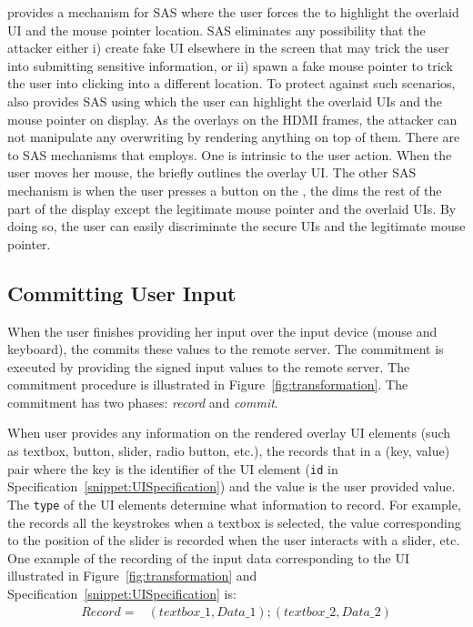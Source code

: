 \name provides a mechanism for SAS where the user forces the \device to highlight the overlaid UI and the mouse pointer location. SAS eliminates any possibility that the attacker either i) create fake UI elsewhere in the screen that may trick the user into submitting sensitive information, or ii) spawn a fake mouse pointer to trick the user into clicking into a different location. To protect against such scenarios, \device also provides SAS using which the user can highlight the overlaid UIs and the mouse pointer on display. As the \device overlays on the HDMI frames, the attacker can not manipulate any overwriting by rendering anything on top of them. 
There are to SAS mechanisms that \name employs. One is intrinsic to the user action. When the user moves her mouse, the \device briefly outlines the overlay UI. The other SAS mechanism is when the user presses a button on the \device, the \device dims the rest of the part of the display except the legitimate mouse pointer and the overlaid UIs. By doing so, the user can easily discriminate the secure UIs and the legitimate mouse pointer.
 

\subsection{Committing User Input}
\label{sec:systemDesign:commit}

When the user finishes providing her input over the input device (mouse and keyboard), the \device commits these values to the remote server. The commitment is executed by providing the signed input values to the remote server. The commitment procedure is illustrated in Figure~\ref{fig:transformation}. The commitment has two phases: \emph{record} and \emph{commit}.

 When user provides any information on the rendered overlay UI elements (such as textbox, button, slider, radio button, etc.), the \device records that in a (key, value) pair where the key is the identifier of the UI element (\texttt{id} in Specification~\ref{snippet:UISpecification}) and the value is the user provided value. The \texttt{type} of the UI elements determine what information to record. For example, the \device records all the keystrokes when a textbox is selected, the value corresponding to the position of the slider is recorded when the user interacts with a slider, etc. One example of the recording of the input data corresponding to the UI illustrated in Figure~\ref{fig:transformation} and Specification~\ref{snippet:UISpecification} is: 
\begin{align*}
Record = & (textbox\_1, Data\_1);(textbox\_2,Data\_2)
\end{align*}


